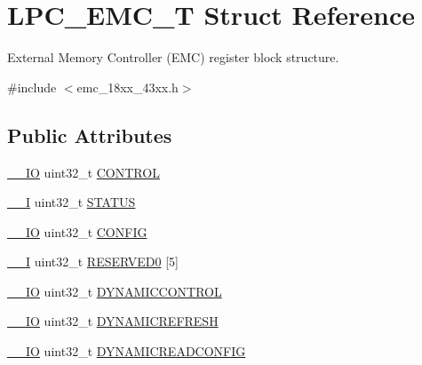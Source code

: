 \hypertarget{struct_l_p_c___e_m_c___t}{}\section{L\+P\+C\+\_\+\+E\+M\+C\+\_\+T Struct Reference}
\label{struct_l_p_c___e_m_c___t}


External Memory Controller (E\+MC) register block structure.  




{\ttfamily \#include $<$emc\+\_\+18xx\+\_\+43xx.\+h$>$}

\subsection*{Public Attributes}
\begin{DoxyCompactItemize}
\item 
\hyperlink{core__sc300_8h_aec43007d9998a0a0e01faede4133d6be}{\+\_\+\+\_\+\+IO} uint32\+\_\+t \hyperlink{struct_l_p_c___e_m_c___t_a2d6b5e4cfddc97c3f44228a9aef1eb40}{C\+O\+N\+T\+R\+OL}
\item 
\hyperlink{core__sc300_8h_af63697ed9952cc71e1225efe205f6cd3}{\+\_\+\+\_\+I} uint32\+\_\+t \hyperlink{struct_l_p_c___e_m_c___t_a84374b5f8ed91b53530950468d49e1c6}{S\+T\+A\+T\+US}
\item 
\hyperlink{core__sc300_8h_aec43007d9998a0a0e01faede4133d6be}{\+\_\+\+\_\+\+IO} uint32\+\_\+t \hyperlink{struct_l_p_c___e_m_c___t_ab9b4e82e4deea2ab7cf2e8b705c6930a}{C\+O\+N\+F\+IG}
\item 
\hyperlink{core__sc300_8h_af63697ed9952cc71e1225efe205f6cd3}{\+\_\+\+\_\+I} uint32\+\_\+t \hyperlink{struct_l_p_c___e_m_c___t_ae4c4391c0e92e71ac7458e56ce19f1d5}{R\+E\+S\+E\+R\+V\+E\+D0} \mbox{[}5\mbox{]}
\item 
\hyperlink{core__sc300_8h_aec43007d9998a0a0e01faede4133d6be}{\+\_\+\+\_\+\+IO} uint32\+\_\+t \hyperlink{struct_l_p_c___e_m_c___t_a610b3aaf7c8309d997eb255bb0d19802}{D\+Y\+N\+A\+M\+I\+C\+C\+O\+N\+T\+R\+OL}
\item 
\hyperlink{core__sc300_8h_aec43007d9998a0a0e01faede4133d6be}{\+\_\+\+\_\+\+IO} uint32\+\_\+t \hyperlink{struct_l_p_c___e_m_c___t_a793d252ba22ec723b8fe50a731a5dbb7}{D\+Y\+N\+A\+M\+I\+C\+R\+E\+F\+R\+E\+SH}
\item 
\hyperlink{core__sc300_8h_aec43007d9998a0a0e01faede4133d6be}{\+\_\+\+\_\+\+IO} uint32\+\_\+t \hyperlink{struct_l_p_c___e_m_c___t_a9e0974205ecc91255bbd55fea7542fc6}{D\+Y\+N\+A\+M\+I\+C\+R\+E\+A\+D\+C\+O\+N\+F\+IG}
\item 

\end{DoxyCompactItemize}
